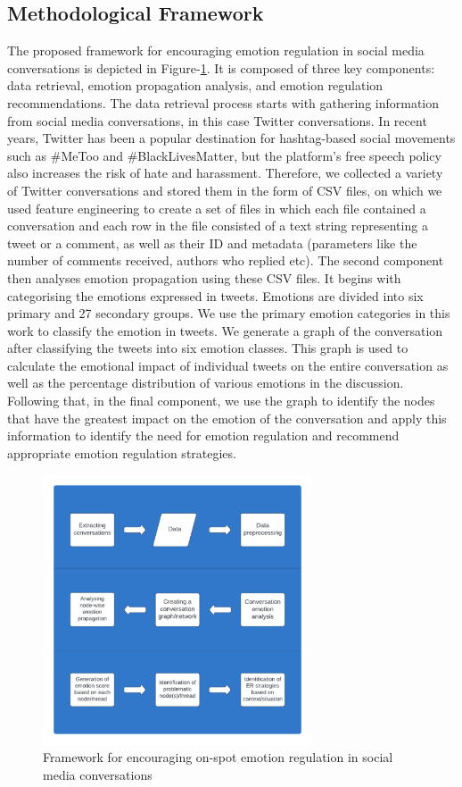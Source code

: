 \documentclass[acmtog]{acmart}
\begin{document}
\subsection{Methodological Framework}
The proposed framework for encouraging emotion regulation in social media conversations is depicted in Figure-\ref{fig:Framework}. It is composed of three key components: data retrieval, emotion propagation analysis, and emotion regulation recommendations. The data retrieval process starts with gathering information from social media conversations, in this case Twitter conversations. In recent years, Twitter has been a popular destination for hashtag-based social movements such as \#MeToo and \#BlackLivesMatter, but the platform's free speech policy also increases the risk of hate and harassment. Therefore, we collected a variety of Twitter conversations and stored them in the form of CSV files, on which we used feature engineering to create a set of files in which each file contained a conversation and each row in the file consisted of a text string representing a tweet or a comment, as well as their ID and metadata (parameters like the number of comments received, authors who replied etc). The second component then analyses emotion propagation using these CSV files. It begins with categorising the emotions expressed in tweets. Emotions are divided into six primary and 27 secondary groups. We use the primary emotion categories in this work to classify the emotion in tweets. We generate a graph of the conversation after classifying the tweets into six emotion classes. This graph is used to calculate the emotional impact of individual tweets on the entire conversation as well as the percentage distribution of various emotions in the discussion. Following that, in the final component, we use the graph to identify the nodes that have the greatest impact on the emotion of the conversation and apply this information to identify the need for emotion regulation and recommend appropriate emotion regulation strategies.
\begin{figure}[h]
  
    \centering
    \includegraphics[width=8cm,height=8cm,keepaspectratio]{framework.pdf}
  \caption{Framework for encouraging on-spot emotion regulation in social media conversations}
  \label{fig:Framework}
  \end{figure}
\end{document}
